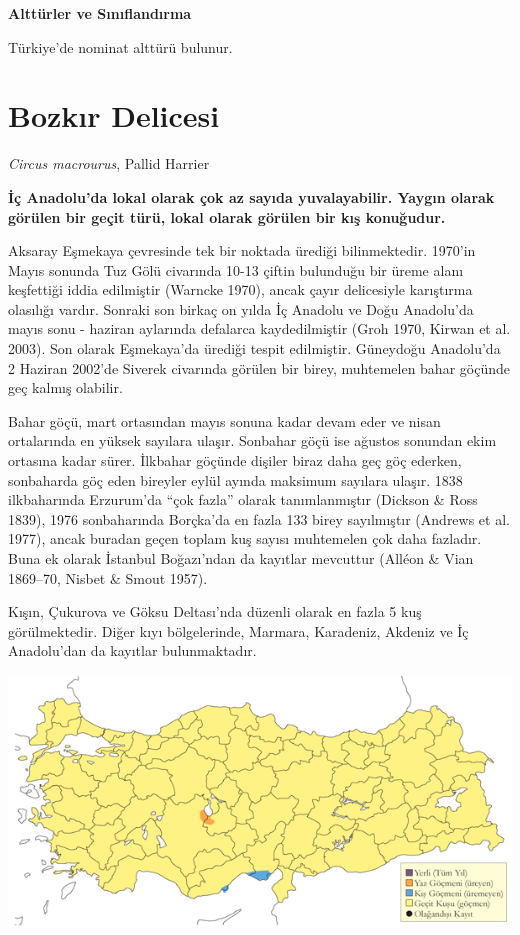 \documentclass[
  letterpaper,
  DIV=11,
  numbers=noendperiod]{scrreprt}
\begin{document}
\textbf{Alttürler ve Sınıflandırma}

Türkiye'de nominat alttürü bulunur.

\section{Bozkır Delicesi}\label{bozkux131r-delicesi}

\emph{Circus macrourus}, Pallid Harrier

\textbf{İç Anadolu'da lokal olarak çok az sayıda yuvalayabilir. Yaygın
olarak görülen bir geçit türü, lokal olarak görülen bir kış konuğudur.}

Aksaray Eşmekaya çevresinde tek bir noktada ürediği bilinmektedir.
1970'in Mayıs sonunda Tuz Gölü civarında 10-13 çiftin bulunduğu bir
üreme alanı keşfettiği iddia edilmiştir (Warncke 1970), ancak çayır
delicesiyle karıştırma olasılığı vardır. Sonraki son birkaç on yılda İç
Anadolu ve Doğu Anadolu'da mayıs sonu - haziran aylarında defalarca
kaydedilmiştir (Groh 1970, Kirwan et al. 2003). Son olarak Eşmekaya'da
ürediği tespit edilmiştir. Güneydoğu Anadolu'da 2 Haziran 2002'de
Siverek civarında görülen bir birey, muhtemelen bahar göçünde geç kalmış
olabilir.

Bahar göçü, mart ortasından mayıs sonuna kadar devam eder ve nisan
ortalarında en yüksek sayılara ulaşır. Sonbahar göçü ise ağustos
sonundan ekim ortasına kadar sürer. İlkbahar göçünde dişiler biraz daha
geç göç ederken, sonbaharda göç eden bireyler eylül ayında maksimum
sayılara ulaşır. 1838 ilkbaharında Erzurum'da ``çok fazla'' olarak
tanımlanmıştır (Dickson \& Ross 1839), 1976 sonbaharında Borçka'da en
fazla 133 birey sayılmıştır (Andrews et al. 1977), ancak buradan geçen
toplam kuş sayısı muhtemelen çok daha fazladır. Buna ek olarak İstanbul
Boğazı'ndan da kayıtlar mevcuttur (Alléon \& Vian 1869--70, Nisbet \&
Smout 1957).

Kışın, Çukurova ve Göksu Deltası'nda düzenli olarak en fazla 5 kuş
görülmektedir. Diğer kıyı bölgelerinde, Marmara, Karadeniz, Akdeniz ve
İç Anadolu'dan da kayıtlar bulunmaktadır.

\includegraphics{images/harita_Page_104.png}
\end{document}
